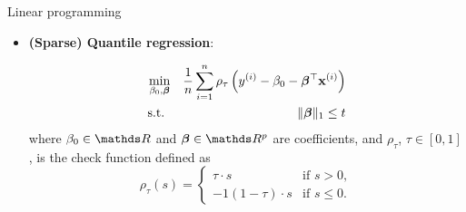 \documentclass[11pt,compress,t,notes=noshow, xcolor=table]{beamer}
\begin{document}
\begin{vbframe}{Linear programming}

















\begin{itemize}
\item \textbf{(Sparse) Quantile regression}:

\vspace{-\baselineskip}

\begin{eqnarray*}
    \min_{\beta_0,\bm{\beta}} && \frac{1}{n}\sum_{i = 1}^n \rho_\tau \left(y^{(i)} - \beta_0 -  \bm{\beta}^\top\mathbf{x}^{(i)}\right) \\
\text{s.t. } && \|\bm{\beta}\|_1 \le t
\end{eqnarray*}
where $\beta_0 \in \R$ and $\bm{\beta} \in \R^p$ are coefficients, and $\rho_\tau$, $\tau \in [0,1]$, is the check function defined as
\begin{equation*}
    \rho_\tau(s) =
    \begin{cases}
        \tau \cdot s & \text{if } s>0, \\
        -1(1-\tau)\cdot s & \text{if } s\le0.
    \end{cases}
\end{equation*}


\end{itemize}
\end{vbframe}
\end{document}
